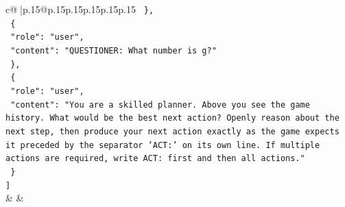 \documentclass{article}
\begin{document}
{\begin{supertabular}{c@{$\;$}|p{.15\linewidth}@{}p{.15\linewidth}p{.15\linewidth}p{.15\linewidth}p{.15\linewidth}p{.15\linewidth}}
{{{\texttt{  \},} \\
\texttt{  \{} \\
\texttt{    "role": "user",} \\
\texttt{    "content": "QUESTIONER: What number is g?"} \\
\texttt{  \},} \\
\texttt{  \{} \\
\texttt{    "role": "user",} \\
\texttt{    "content": "You are a skilled planner. Above you see the game history. What would be the best next action? Openly reason about the next step, then produce your next action exactly as the game expects it preceded by the separator 'ACT:' on its own line. If multiple actions are required, write ACT: first and then all actions."} \\
\texttt{  \}} \\
\texttt{{]}} \\
            }
        }
    }
    & & \\ \\


\end{supertabular}}
\end{document}
